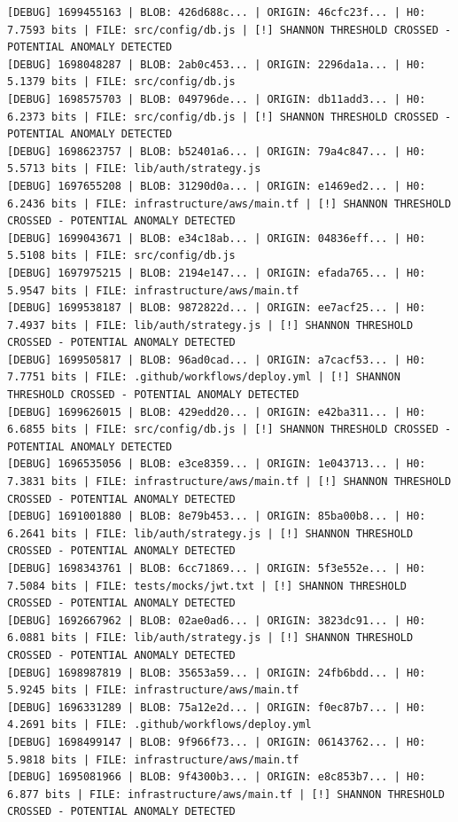 \documentclass[12pt, a4paper, oneside]{report}
\begin{document}
\begin{lstlisting}[basicstyle=\tiny\ttfamily]
[DEBUG] 1699455163 | BLOB: 426d688c... | ORIGIN: 46cfc23f... | H0: 7.7593 bits | FILE: src/config/db.js | [!] SHANNON THRESHOLD CROSSED - POTENTIAL ANOMALY DETECTED
[DEBUG] 1698048287 | BLOB: 2ab0c453... | ORIGIN: 2296da1a... | H0: 5.1379 bits | FILE: src/config/db.js
[DEBUG] 1698575703 | BLOB: 049796de... | ORIGIN: db11add3... | H0: 6.2373 bits | FILE: src/config/db.js | [!] SHANNON THRESHOLD CROSSED - POTENTIAL ANOMALY DETECTED
[DEBUG] 1698623757 | BLOB: b52401a6... | ORIGIN: 79a4c847... | H0: 5.5713 bits | FILE: lib/auth/strategy.js
[DEBUG] 1697655208 | BLOB: 31290d0a... | ORIGIN: e1469ed2... | H0: 6.2436 bits | FILE: infrastructure/aws/main.tf | [!] SHANNON THRESHOLD CROSSED - POTENTIAL ANOMALY DETECTED
[DEBUG] 1699043671 | BLOB: e34c18ab... | ORIGIN: 04836eff... | H0: 5.5108 bits | FILE: src/config/db.js
[DEBUG] 1697975215 | BLOB: 2194e147... | ORIGIN: efada765... | H0: 5.9547 bits | FILE: infrastructure/aws/main.tf
[DEBUG] 1699538187 | BLOB: 9872822d... | ORIGIN: ee7acf25... | H0: 7.4937 bits | FILE: lib/auth/strategy.js | [!] SHANNON THRESHOLD CROSSED - POTENTIAL ANOMALY DETECTED
[DEBUG] 1699505817 | BLOB: 96ad0cad... | ORIGIN: a7cacf53... | H0: 7.7751 bits | FILE: .github/workflows/deploy.yml | [!] SHANNON THRESHOLD CROSSED - POTENTIAL ANOMALY DETECTED
[DEBUG] 1699626015 | BLOB: 429edd20... | ORIGIN: e42ba311... | H0: 6.6855 bits | FILE: src/config/db.js | [!] SHANNON THRESHOLD CROSSED - POTENTIAL ANOMALY DETECTED
[DEBUG] 1696535056 | BLOB: e3ce8359... | ORIGIN: 1e043713... | H0: 7.3831 bits | FILE: infrastructure/aws/main.tf | [!] SHANNON THRESHOLD CROSSED - POTENTIAL ANOMALY DETECTED
[DEBUG] 1691001880 | BLOB: 8e79b453... | ORIGIN: 85ba00b8... | H0: 6.2641 bits | FILE: lib/auth/strategy.js | [!] SHANNON THRESHOLD CROSSED - POTENTIAL ANOMALY DETECTED
[DEBUG] 1698343761 | BLOB: 6cc71869... | ORIGIN: 5f3e552e... | H0: 7.5084 bits | FILE: tests/mocks/jwt.txt | [!] SHANNON THRESHOLD CROSSED - POTENTIAL ANOMALY DETECTED
[DEBUG] 1692667962 | BLOB: 02ae0ad6... | ORIGIN: 3823dc91... | H0: 6.0881 bits | FILE: lib/auth/strategy.js | [!] SHANNON THRESHOLD CROSSED - POTENTIAL ANOMALY DETECTED
[DEBUG] 1698987819 | BLOB: 35653a59... | ORIGIN: 24fb6bdd... | H0: 5.9245 bits | FILE: infrastructure/aws/main.tf
[DEBUG] 1696331289 | BLOB: 75a12e2d... | ORIGIN: f0ec87b7... | H0: 4.2691 bits | FILE: .github/workflows/deploy.yml
[DEBUG] 1698499147 | BLOB: 9f966f73... | ORIGIN: 06143762... | H0: 5.9818 bits | FILE: infrastructure/aws/main.tf
[DEBUG] 1695081966 | BLOB: 9f4300b3... | ORIGIN: e8c853b7... | H0: 6.877 bits | FILE: infrastructure/aws/main.tf | [!] SHANNON THRESHOLD CROSSED - POTENTIAL ANOMALY DETECTED
\end{lstlisting}
\end{document}
